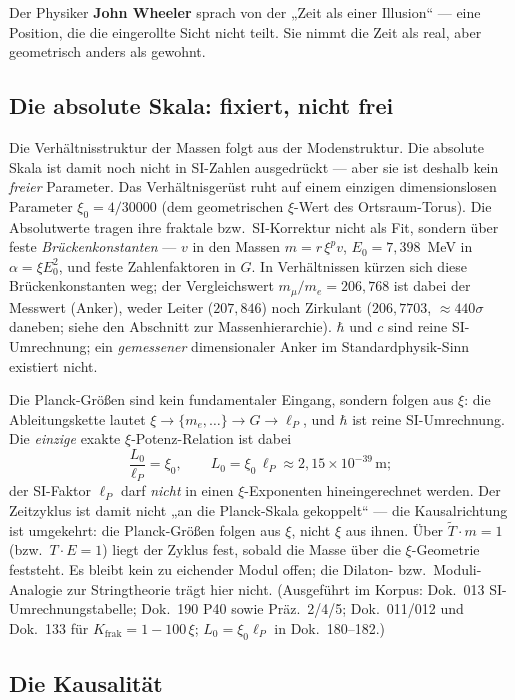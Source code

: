 Der Physiker \textbf{John Wheeler} sprach von der „Zeit als einer Illusion`` --- eine Position, die die eingerollte Sicht nicht teilt. Sie nimmt die Zeit als real, aber geometrisch anders als gewohnt.

\subsection{Die absolute Skala: fixiert, nicht frei}

Die Verhältnisstruktur der Massen folgt aus der Modenstruktur. Die absolute Skala ist damit noch nicht in SI-Zahlen ausgedrückt --- aber sie ist deshalb kein \emph{freier} Parameter. Das Verhältnisgerüst ruht auf einem einzigen dimensionslosen Parameter $\xi_0 = 4/30000$ (dem geometrischen $\xi$-Wert des Ortsraum-Torus). Die Absolutwerte tragen ihre fraktale bzw.\ SI-Korrektur nicht als Fit, sondern über feste \emph{Brückenkonstanten} --- $v$ in den Massen $m = r\,\xi^{p} v$, $E_0 = 7{,}398$~MeV in $\alpha = \xi E_0^2$, und feste Zahlenfaktoren in $G$. In Verhältnissen kürzen sich diese Brückenkonstanten weg; der Vergleichswert $m_\mu/m_e = 206{,}768$ ist dabei der Messwert (Anker), weder Leiter ($207{,}846$) noch Zirkulant ($206{,}7703$, ${\approx}440\sigma$ daneben; siehe den Abschnitt zur Massenhierarchie). $\hbar$ und $c$ sind reine SI-Umrechnung; ein \emph{gemessener} dimensionaler Anker im Standardphysik-Sinn existiert nicht.

Die Planck-Größen sind kein fundamentaler Eingang, sondern folgen aus $\xi$: die Ableitungskette lautet $\xi \to \{m_e,\dots\} \to G \to \ell_P$, und $\hbar$ ist reine SI-Umrechnung. Die \emph{einzige} exakte $\xi$-Potenz-Relation ist dabei
\[
 \frac{L_0}{\ell_P} = \xi_0, \qquad L_0 = \xi_0\,\ell_P \approx 2{,}15\times10^{-39}\,\text{m};
\]
der SI-Faktor $\ell_P$ darf \emph{nicht} in einen $\xi$-Exponenten hineingerechnet werden. Der Zeitzyklus ist damit nicht „an die Planck-Skala gekoppelt`` --- die Kausalrichtung ist umgekehrt: die Planck-Größen folgen aus $\xi$, nicht $\xi$ aus ihnen. Über $\tilde{T}\cdot m = 1$ (bzw.\ $T\cdot E = 1$) liegt der Zyklus fest, sobald die Masse über die $\xi$-Geometrie feststeht. Es bleibt kein zu eichender Modul offen; die Dilaton- bzw.\ Moduli-Analogie zur Stringtheorie trägt hier nicht. (Ausgeführt im Korpus: Dok.~013 SI-Umrechnungstabelle; Dok.~190 P40 sowie Präz.~2/4/5; Dok.~011/012 und Dok.~133 für $K_\text{frak}=1-100\,\xi$; $L_0=\xi_0\ell_P$ in Dok.~180--182.)

\subsection{Die Kausalität}


